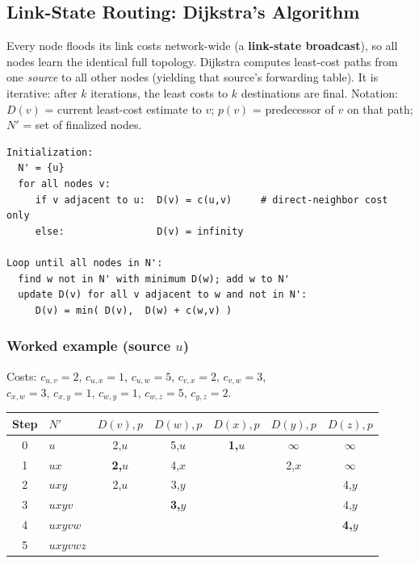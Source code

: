 \documentclass[hidelinks]{article}
\begin{document}
\subsection{Link-State Routing: Dijkstra's Algorithm}

Every node floods its link costs network-wide (a \textbf{link-state
broadcast}), so all nodes learn the identical full topology. Dijkstra computes
least-cost paths from one \emph{source} to all other nodes (yielding that
source's forwarding table). It is iterative: after $k$ iterations, the least
costs to $k$ destinations are final. Notation: $D(v)$ = current least-cost
estimate to $v$; $p(v)$ = predecessor of $v$ on that path; $N'$ = set of
finalized nodes.

\begin{lstlisting}[caption={Dijkstra's link-state algorithm (source $u$)}]
Initialization:
  N' = {u}
  for all nodes v:
     if v adjacent to u:  D(v) = c(u,v)     # direct-neighbor cost only
     else:                D(v) = infinity

Loop until all nodes in N':
  find w not in N' with minimum D(w); add w to N'
  update D(v) for all v adjacent to w and not in N':
     D(v) = min( D(v),  D(w) + c(w,v) )
\end{lstlisting}

\subsubsection{Worked example (source $u$)}
Costs: $c_{u,v}{=}2$, $c_{u,x}{=}1$, $c_{u,w}{=}5$, $c_{v,x}{=}2$,
$c_{v,w}{=}3$, \\ $c_{x,w}{=}3$, $c_{x,y}{=}1$, $c_{w,y}{=}1$, $c_{w,z}{=}5$,
$c_{y,z}{=}2$.

\renewcommand{\arraystretch}{1.3}
\noindent\begin{tabularx}{\textwidth}{|c|l|c|c|c|c|c|}
\hline
\textbf{Step} & \textbf{$N'$} & \textbf{$D(v),p$} & \textbf{$D(w),p$} & \textbf{$D(x),p$} & \textbf{$D(y),p$} & \textbf{$D(z),p$} \\
\hline
0 & $u$      & 2,$u$ & 5,$u$ & \textbf{1,$u$} & $\infty$ & $\infty$ \\
\hline
1 & $ux$     & \textbf{2,$u$} & 4,$x$ & & 2,$x$ & $\infty$ \\
\hline
2 & $uxy$    & 2,$u$ & 3,$y$ & & & 4,$y$ \\
\hline
3 & $uxyv$   & & \textbf{3,$y$} & & & 4,$y$ \\
\hline
4 & $uxyvw$  & & & & & \textbf{4,$y$} \\
\hline
5 & $uxyvwz$ & & & & & \\
\hline
\end{tabularx}
\end{document}
